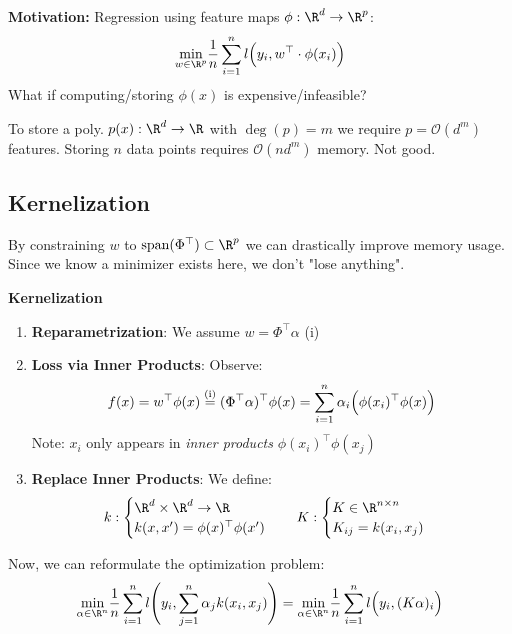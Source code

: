 \textbf{Motivation:} Regression using feature maps $\phi: \R^d \to \R^p$:
$$
    \underset{w \in \R^p}{\min}\frac{1}{n}\sum_{i=1}^{n}l\Bigl( y_i, w^\top \cdot \phi(x_i) \Bigr)
$$
What if computing/storing $\phi(x)$ is expensive/infeasible?\\

{\scriptsize
    \remark To store a poly. $p(x): \R^d \to \R$ with $\deg(p)=m$ we require $p=\mathcal{O}(d^m)$ features. Storing $n$ data points requires $\mathcal{O}(nd^m)$ memory. Not good.
}

\subsection{Kernelization}

By constraining $w$ to $\text{span}(\Phi^\top) \subset \R^p$ we can drastically improve memory usage. Since we know a minimizer exists here, we don't "lose anything".

 \textbf{Kernelization}

\begin{enumerate}
    \item \textbf{Reparametrization}: We assume $w = \Phi^\top\alpha$ (i)
    \item \textbf{Loss via Inner Products}: Observe:
    $$
        f(x) = w^\top \phi(x) \overset{\text{(i)}}{=} (\Phi^\top \alpha)^\top \phi(x) = \sum_{i=1}^{n} \alpha_i \Bigl( \phi(x_i)^\top \phi(x) \Bigr)
    $$
    Note: $x_i$ only appears in \textit{inner products} $\phi(x_i)^\top \phi(x_j)$
    \item \textbf{Replace Inner Products}: We define:
    $$
        k:\begin{cases}
            \R^d\times\R^d\to\R \\
            k(x,x') = \phi(x)^\top \phi(x')
        \end{cases}
        \quad
        K:\begin{cases}
            K \in \R^{n\times n} \\
            K_{ij} = k(x_i,x_j)
        \end{cases}
    $$
\end{enumerate}

Now, we can reformulate the optimization problem:
$$
    \underset{\alpha\in\R^n}{\min}\frac{1}{n}\sum_{i=1}^{n}l\Biggl( y_i, \sum_{j=1}^{n}\alpha_j k(x_i,x_j) \Biggr) = \underset{\alpha\in\R^n}{\min}\frac{1}{n}\sum_{i=1}^{n}l\Bigl( y_i, (K\alpha)_i \Bigr)
$$

